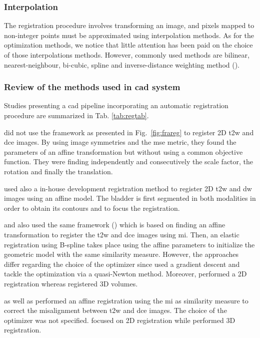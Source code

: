 \subsubsection{Interpolation}\label{subsubsec:int}

The registration procedure involves transforming an image, and pixels mapped to non-integer points must be approximated using interpolation methods. As for the optimization methods, we notice that little attention has been paid on the choice of those interpolations methods. However, commonly used methods are bilinear, nearest-neighbour, bi-cubic, spline and inverse-distance weighting method (\cite{Mitra2012}).

\subsubsection{Review of the methods used in \ac{cad} system}\label{subsubsec:regrev}

Studies presenting a \ac{cad} pipeline incorporating an automatic registration procedure are summarized in Tab. \ref{tab:regtab}. 

\cite{Ampeliotis2007,Ampeliotis2008} did not use the framework as presented in Fig.~\ref{fig:frareg} to register 2D \ac{t2w} and \ac{dce} images. By using image symmetries and the \ac{mse} metric, they found the parameters of an affine transformation but without using a common objective function. They were finding independently and consecutively the scale factor, the rotation and finally the translation.

\cite{Giannini2013} used also a in-house development registration method to register 2D \ac{t2w} and \ac{dw} images using an affine model. The bladder is first segmented in both modalities in order to obtain its contours and to focus the registration.

\cite{Giannini2013} and also \cite{Vos2010} used the same framework (\cite{Rueckert1999}) which is based on finding an affine transformation to register the \ac{t2w} and \ac{dce} images using \ac{mi}. Then, an elastic registration using B-spline takes place using the affine parameters to initialize the geometric model with the  same similarity measure. However, the approaches differ regarding the choice of the optimizer since \cite{Giannini2013} used a gradient descent and \cite{Vos2010} tackle the optimization via a quasi-Newton method. Moreover, \cite{Giannini2013} performed a 2D registration whereas \cite{Vos2010} registered 3D volumes.

\cite{Viswanath2008a,Viswanath2009} as well as \cite{Vos2008} performed an affine registration using the \ac{mi} as similarity measure to correct the misalignment between \ac{t2w} and \ac{dce} images. The choice of the optimizer was not specified. \cite{Viswanath2008a,Viswanath2009} focused on 2D registration while \cite{Vos2008} performed 3D registration.

